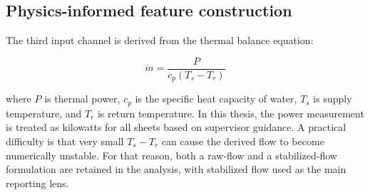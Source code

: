 \subsection{Physics-informed feature construction}

The third input channel is derived from the thermal balance equation:

\[
\dot{m} = \frac{P}{c_p (T_s - T_r)}
\]

where \(P\) is thermal power, \(c_p\) is the specific heat capacity of water, \(T_s\) is supply temperature, and \(T_r\) is return temperature. In this thesis, the power measurement is treated as kilowatts for all sheets based on supervisor guidance. A practical difficulty is that very small \(T_s - T_r\) can cause the derived flow to become numerically unstable. For that reason, both a raw-flow and a stabilized-flow formulation are retained in the analysis, with stabilized flow used as the main reporting lens.
